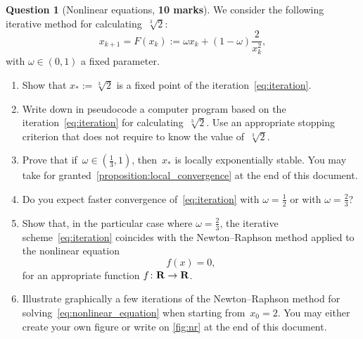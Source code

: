 \documentclass[10pt]{article}
\theoremstyle{definition}
\newtheorem{question}{Question}
\theoremstyle{remark}
\theoremstyle{plain}%
\begin{document}
\newpage
\begin{question}
    [Nonlinear equations, \textbf{10 marks}]
    We consider the following iterative method for calculating~$\sqrt[3]{2}$:
    \begin{equation}
        \label{eq:iteration}
        x_{k+1} = F(x_k) :=  \omega x_k + (1 - \omega) \frac{2}{x_k^2},
    \end{equation}
    with $\omega \in (0, 1)$ a fixed parameter.
    \begin{enumerate}
        \item
            \mymark
            Show that $x_* := \sqrt[3]{2}$ is a fixed point of the iteration~\eqref{eq:iteration}.

        \item
            Write down in pseudocode a computer program based on the iteration~\eqref{eq:iteration} for calculating~$\sqrt[3]{2}$.
            Use an appropriate stopping criterion that does not require to know the value of~$\sqrt[3]{2}$.

        \item
            Prove that if~$\omega \in \left(\frac{1}{3}, 1\right)$,
            then~$x_*$ is locally exponentially stable.
            You may take for granted~\cref{proposition:local_convergence} at the end of this document.

        \item
            \mymark
            Do you expect faster convergence of~\eqref{eq:iteration} with $\omega = \frac{1}{2}$ or with $\omega = \frac{2}{3}$?

        \item
            Show that, in the particular case where $\omega = \frac{2}{3}$,
            the iterative scheme~\eqref{eq:iteration} coincides with the Newton--Raphson method applied to
            the nonlinear equation
            \begin{equation}
                \label{eq:nonlinear_equation}
                f(x) = 0,
            \end{equation}
            for an appropriate function $f \colon \mathbf R \to \mathbf R$.

        \item
            Illustrate graphically a few iterations of the Newton--Raphson method for solving~\eqref{eq:nonlinear_equation} when starting from~$x_0 = 2$.
            You may either create your own figure or write on \cref{fig:nr} at the end of this document.


\end{enumerate}
\end{question}
\end{document}
